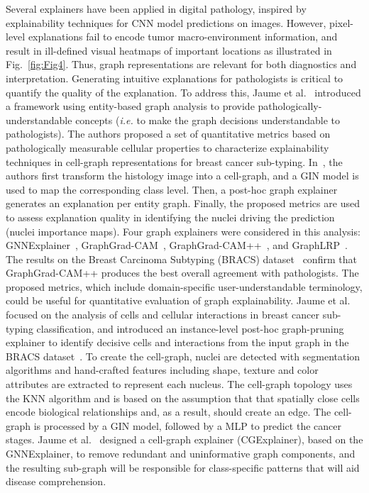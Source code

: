 Several explainers have been applied in digital pathology, inspired by explainability techniques for CNN model predictions on images. However, pixel-level explanations fail to encode tumor macro-environment information, and result in ill-defined visual heatmaps of important locations as illustrated in Fig.~\ref{fig:Fig4}. Thus, graph representations are relevant for both diagnostics and interpretation. Generating intuitive explanations for pathologists is critical to quantify the quality of the explanation.
To address this, Jaume et al.~ introduced a framework using entity-based graph analysis to provide pathologically-understandable concepts (\textit{i.e.} to make the graph decisions understandable to pathologists).
The authors proposed a set of quantitative metrics based on pathologically measurable cellular properties to characterize explainability techniques in cell-graph representations for breast cancer sub-typing. 
In~, the authors first transform the histology image into a cell-graph, and a GIN model is used to map the corresponding class level. Then, a post-hoc graph explainer generates an explanation per entity graph. Finally, the proposed metrics are used to assess explanation quality in identifying the nuclei driving the prediction (nuclei importance maps). 
Four graph explainers were considered in this analysis: 
GNNExplainer~, GraphGrad-CAM~,  GraphGrad-CAM++~, and GraphLRP~.
The results on the Breast Carcinoma Subtyping (BRACS) dataset~ confirm that GraphGrad-CAM++ produces the best overall agreement with pathologists. The proposed metrics, which include domain-specific user-understandable terminology, could be useful for quantitative evaluation of graph explainability.
Jaume et al.~ focused on the analysis of cells and cellular interactions in breast cancer sub-typing classification, and introduced an instance-level post-hoc graph-pruning explainer to identify decisive cells and interactions from the input graph in the BRACS dataset~.
To create the cell-graph, nuclei are detected with segmentation algorithms and hand-crafted features including shape, texture and color attributes are extracted to represent each nucleus. The cell-graph topology uses the KNN algorithm and is based on the assumption that that spatially close cells encode biological relationships and, as a result, should create an edge. 
The cell-graph is processed by a GIN model, followed by a MLP to predict the cancer stages.
Jaume et al.~ designed a cell-graph explainer (CGExplainer), based on the GNNExplainer, to remove redundant and uninformative graph components, and the resulting sub-graph will be responsible for class-specific patterns that will aid disease comprehension. 
